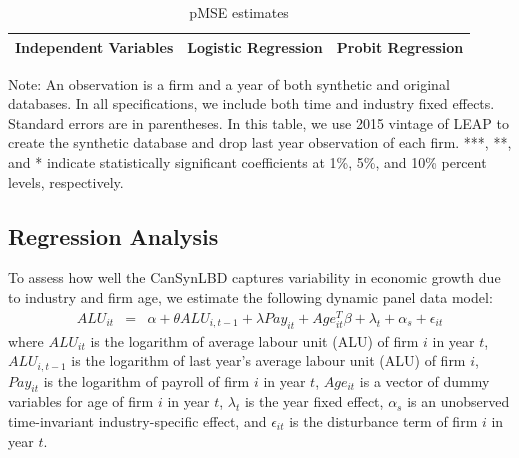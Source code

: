 \documentclass{article}
\begin{document}
\begin{table}[H]
  \centering
\begin{threeparttable}
 \caption{pMSE estimates} \label{pMSE_regression} \medskip
\renewcommand{\arraystretch}{1}
\begin{tabular}{l|c c| c c}
\toprule
\textbf{Independent Variables}&\multicolumn{2}{c|}{\textbf{Logistic Regression}} &  \multicolumn{2}{c}{\textbf{Probit Regression}}\\
\midrule

   \bottomrule
  \end{tabular} 
\begin{tablenotes}
\small
\item Note: An observation is a firm and a year of both synthetic and original databases. In all specifications, we include both time and industry fixed effects. Standard errors are in parentheses. In this table, we use 2015 vintage of LEAP to create the synthetic database and drop last year observation of each firm. ***, **, and * indicate statistically significant coefficients at 1\%, 5\%, and 10\% percent levels, respectively.
 \end{tablenotes}
 \end{threeparttable}
\end{table}


\subsection{Regression Analysis}
To assess how well the CanSynLBD captures variability in economic growth due to industry and firm age, we estimate the following dynamic panel data model:
\begin{eqnarray}	
ALU_{it}&=&\alpha +\theta ALU_{i,t-1}+\lambda Pay_{it}+Age_{it}^{T}\beta+\lambda_t+\alpha_s+\epsilon_{it}
\end{eqnarray}
where $ALU_{it}$ is the logarithm of average labour unit (ALU) of firm $i$ in year $t$, $ALU_{i,t-1}$ is the logarithm of last year's average labour unit (ALU) of firm $i$, $Pay_{it}$ is the logarithm of payroll of firm $i$ in year $t$, $Age_{it}$ is a vector of dummy variables for age of firm $i$ in year $t$, $\lambda_t$ is the year fixed effect, $\alpha_s$ is an unobserved time-invariant industry-specific effect, and $\epsilon_{it}$ is the disturbance term of firm $i$ in year $t$. 
\end{document}
